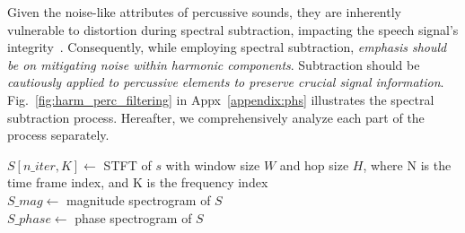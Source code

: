 Given the noise-like attributes of percussive sounds, they are inherently vulnerable to distortion during spectral subtraction, impacting the speech signal's integrity~\cite{cano2014phase, tachibana2014harmonic}. 
Consequently, while employing spectral subtraction,\textit{ emphasis should be on mitigating noise within harmonic components}.
Subtraction should be \textit{cautiously applied to percussive elements to preserve crucial signal information}. 
Fig.~\ref{fig:harm_perc_filtering} in Appx~\ref{appendix:phs} illustrates the spectral subtraction process. Hereafter, we comprehensively analyze each part of the process separately.
\begin{algorithm}[ht!]
	\footnotesize
	\DontPrintSemicolon
	\caption{PHS using median filtering.}
	\label{alg:MFAlgorithm}


$S[n\_iter,K] \gets$ STFT of $s$ with window size $W$ and hop size $H$, where N is the time frame index, and K is the frequency index\\
$S\_mag \gets$ magnitude spectrogram of $S$\\
$S\_phase \gets$ phase spectrogram of $S$


\end{algorithm}




